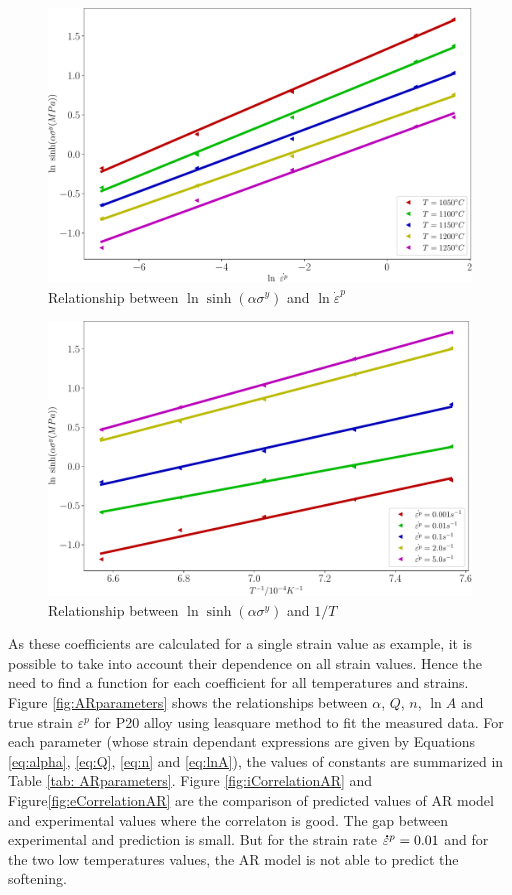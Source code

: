 \documentclass[twoside,english,1p,final,sort&compress]{elsarticle}
\theoremstyle{plain}
\newcommand{\mdot}[1]{\accentset{\mbox{\bfseries .}}{#1}}
\begin{document}
\begin{figure}[!ht]
\centering
\includegraphics[width=0.9\columnwidth]{newFigures/LnSinhE}
\caption{Relationship between $\ln \sinh(\alpha\sigma^y) $ and $\ln \dot{\varepsilon}^p$}
\label{fig:LnSinhE}
\end{figure}
\begin{figure}[!ht]
\centering
\includegraphics[width=0.9\columnwidth]{newFigures/LnSinhT}
\caption{Relationship between $\ln \sinh(\alpha\sigma^y) $ and $1/T$}
\label{fig:LnSinhT}
\end{figure}
As these coefficients are calculated for a single strain value as example, it is possible to take into account their dependence on all strain values. Hence the need to find a function for each coefficient for all temperatures and strains. Figure  \ref{fig:ARparameters} shows the relationships between $\alpha$, $Q$, $n$, $\ln A$ and true strain $\varepsilon^p$ for P20 alloy using leasquare method to fit the measured data. For each parameter (whose strain dependant expressions are given by Equations \ref{eq:alpha}, \ref{eq:Q}, \ref{eq:n} and \ref{eq:lnA}), the values of constants are summarized in Table \ref{tab: ARparameters}. Figure \ref{fig:iCorrelationAR} and Figure\ref{fig:eCorrelationAR} are the comparison of predicted values of AR model and experimental values where the correlaton is good. The gap between experimental and prediction is small. But for the strain rate $\mdot{\varepsilon}^p = 0.01$ and for the two low temperatures values, the AR model is not able to predict the softening.
\end{document}
